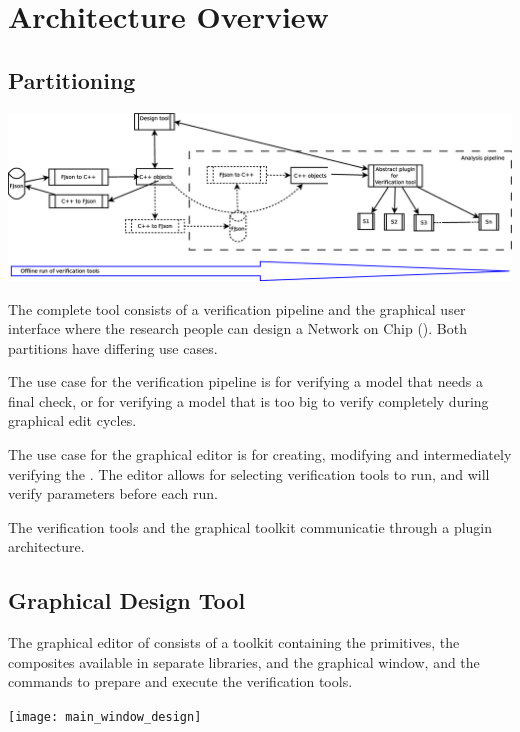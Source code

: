 \chapter{Architecture Overview}

\section{Partitioning}

\begin{center}
	\includegraphics[width=.9\linewidth]{architecture-tool-scope}
\end{center}

The complete tool consists of a verification pipeline and
the graphical user interface where the research people
can design a Network on Chip (\NoC). Both partitions have differing
use cases. 

The use case for the verification pipeline is for verifying a model 
that needs a final check, or for verifying a model that is too 
big to verify completely during graphical edit cycles.

The use case for the graphical editor is for creating, modifying 
and intermediately verifying the \NoC. The editor allows for 
selecting verification tools to run, and will verify parameters
before each run.

The verification tools and the graphical toolkit communicatie 
through a plugin architecture.

\section{Graphical Design Tool}

The graphical editor of \NoC consists of a toolkit containing
the \xmas primitives, the composites available in separate 
libraries, and the graphical window, and the commands to 
prepare and execute the verification tools.

\begin{center}
	\texttt{[image: main\_window\_design]}
	\label{fig:screenprint_main_window}
\end{center}

